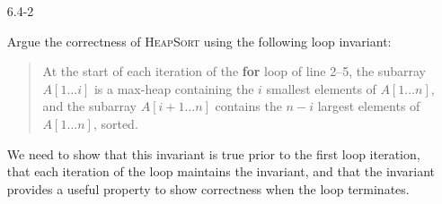 \documentclass{report}
\makeatletter
\renewenvironment{framed}{%
 \def\FrameCommand##1{\hskip\@totalleftmargin
 \fboxsep=\FrameSep\fbox{##1}}%
 \MakeFramed {\advance\hsize-\width
   \@totalleftmargin\z@ \linewidth\hsize
   \@setminipage}}%
 {\par\unskip\endMakeFramed}
\makeatother
\begin{document}
\begin{enumerate}
\begin{framed}
\begin{center}
\end{center}
\end{framed}

\item[6.4-2]{Argue the correctness of \textsc{HeapSort} using the following loop
invariant:
\begin{quote}
At the start of each iteration of the \textbf{for} loop of line 2{--}5, the
subarray $A[1 \dots i]$ is a max-heap containing the $i$ smallest elements of
$A[1 \dots n]$, and the subarray $A[i + 1 \dots n]$ contains the $n - i$ largest
elements of $A[1 \dots n]$, sorted. \vspace{0.5em}
\end{quote}
}

\begin{framed}
We need to show that this invariant is true prior to the first loop iteration,
that each iteration of the loop maintains the invariant, and that the invariant
provides a useful property to show correctness when the loop terminates.


\end{framed}
\end{enumerate}
\end{document}
